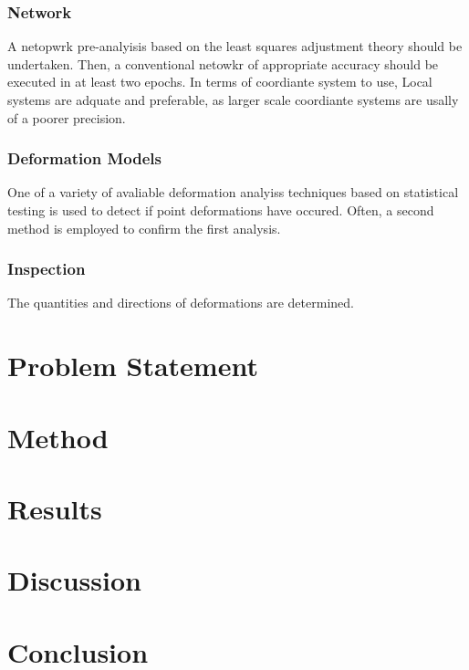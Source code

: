 \documentclass{article}
\begin{document}
\subsubsection{Network}
A netopwrk pre-analyisis based on the least squares adjustment theory should be
undertaken. Then, a conventional netowkr of appropriate accuracy should be
executed in at least two epochs. In terms of coordiante system to use, Local
systems are adquate and preferable, as larger scale coordiante systems are
usally of a poorer precision.

\subsubsection{Deformation Models}
One of a variety of avaliable deformation analyiss techniques based on statistical
testing is used to detect if point deformations have occured. Often, a second
method is employed to confirm the first analysis.

\subsubsection{Inspection}
The quantities and directions of deformations are determined.


\section{Problem Statement}

\section{Method}

\section{Results}

\section{Discussion}

\section{Conclusion}
\end{document}
